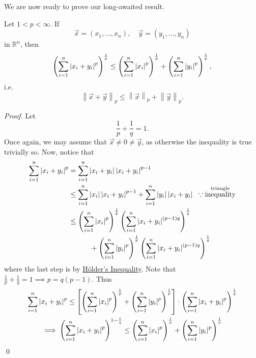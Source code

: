\documentclass[notoc,notitlepage]{tufte-book}
\newcommand{\norm}[1]{\left\| #1 \right\|}
\begin{document}
We are now ready to prove our long-awaited result.

\begin{thm}\label{thm:minkowshi_s_inequality}
  Let $1 < p < \infty$. If
  \begin{equation*}
    \vec{x} = ( x_1, \ldots, x_n ), \quad \vec{y} = ( y_1, \ldots, y_n )
  \end{equation*}
  in $\mathbb{R}^n$, then
  \begin{equation*}
    \left( \sum_{i=1}^{n} \left|x_i + y_i\right|^p \right)^\frac{1}{p} \leq \left( \sum_{i=1}^{n} \left|x_i\right|^p \right)^\frac{1}{p} + \left( \sum_{i=1}^{n} \left|y_i\right|^p \right)^\frac{1}{p},
  \end{equation*}
  i.e.
  \begin{equation*}
    \norm{\vec{x} + \vec{y}}_p \leq \norm{\vec{x}}_p + \norm{\vec{y}}_p.
  \end{equation*}
\end{thm}

\begin{proof}
  Let
  \begin{equation*}
    \frac{1}{p} + \frac{1}{q} = 1.
  \end{equation*}
  Once again, we may assume that $\vec{x} \neq 0 \neq \vec{y}$, as otherwise the inequality is true trivially so. Now, notice that
  \begin{align*}
    \sum_{i=1}^{n} \left|x_i + y_i\right|^p &= \sum_{i=1}^{n} \left|x_i + y_i\right| \left|x_i + y_i\right|^{p - 1} \\
                                     &\leq \sum_{i=1}^{n} \left|x_i\right| \left|x_i + y_i\right|^{p - 1} + \sum_{i=1}^{n} \left|y_i\right|\left|x_i + y_i\right| \enspace \because \overset{\text{triangle}}{\text{inequality}} \\
                                     &\leq \left( \sum_{i=1}^{n} \left|x_i\right|^p \right)^\frac{1}{p} \left( \sum_{i=1}^{n} \left|x_i + y_i\right|^{(p - 1)q} \right)^\frac{1}{q} \\
                                     & \qquad\quad + \left( \sum_{i=1}^{n} \left|y_i\right|^p \right)^\frac{1}{p} \left( \sum_{i=1}^{n} \left|x_i + y_i\right|^{(p - 1)q} \right)^\frac{1}{q}
  \end{align*}
  where the last step is by \hyperref[thm:holder_s_inequality]{H\"{o}lder's Inequality}. Note that $\frac{1}{p} + \frac{1}{q} = 1 \implies p = q(p - 1)$. Thus
  \begin{gather*}
    \sum_{i=1}^{n} \left|x_i + y_i\right|^p \leq \left[ \left( \sum_{i=1}^{n} \left|x_i\right|^p \right)^\frac{1}{p} + \left( \sum_{i=1}^{n} \left|y_i\right|^p \right)^{\frac{1}{p}} \right] \cdot \left( \sum_{i=1}^{n} \left|x_i + y_i\right|^p \right)^\frac{1}{q} \\
    \implies \left( \sum_{i=1}^{n} \left|x_i + y_i\right|^p \right)^{1 - \frac{1}{q}} \leq \left( \sum_{i=1}^{n} \left|x_i\right|^p \right)^\frac{1}{p} + \left( \sum_{i=1}^{n} \left|y_i\right|^p \right)^\frac{1}{p}
  \end{gather*}\qed
\end{proof}
\end{document}
